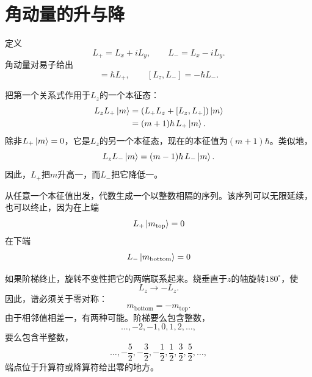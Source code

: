 \begin{classroomqa}
\end{classroomqa}

\section{角动量的升与降}

定义
\begin{equation}
L_+=L_x+iL_y,
\qquad
L_-=L_x-iL_y.
\end{equation}
角动量对易子给出
\begin{equation}
[L_z,L_+]=\hbar L_+,
\qquad
[L_z,L_-]=-\hbar L_-.
\end{equation}

把第一个关系式作用于\(L_z\)的一个本征态：
\begin{align}
L_zL_+\left\lvert m\right\rangle
&=\left(L_+L_z+[L_z,L_+]\right)\left\lvert m\right\rangle\\
&=(m+1)\hbar\,L_+\left\lvert m\right\rangle.
\end{align}
除非\(L_+\left\lvert m\right\rangle=0\)，它是\(L_z\)的另一个本征态，现在的本征值为\((m+1)\hbar\)。类似地，
\begin{equation}
L_zL_-\left\lvert m\right\rangle
=(m-1)\hbar\,L_-\left\lvert m\right\rangle.
\end{equation}
因此，\(L_+\)把\(m\)升高一，而\(L_-\)把它降低一。

从任意一个本征值出发，代数生成一个以整数相隔的序列。该序列可以无限延续，也可以终止，因为在上端
\begin{equation}
L_+\left\lvert m_{\mathrm{top}}\right\rangle=0
\end{equation}
在下端
\begin{equation}
L_-\left\lvert m_{\mathrm{bottom}}\right\rangle=0
\end{equation}

\begin{classroomqa}
\end{classroomqa}

如果阶梯终止，旋转不变性把它的两端联系起来。绕垂直于\(z\)的轴旋转\(180^\circ\)，使
\begin{equation}
L_z\longrightarrow-L_z.
\end{equation}
因此，谱必须关于零对称：
\begin{equation}
m_{\mathrm{bottom}}=-m_{\mathrm{top}}.
\end{equation}
由于相邻值相差一，有两种可能。阶梯要么包含整数，
\begin{equation}
\ldots,-2,-1,0,1,2,\ldots,
\end{equation}
要么包含半整数，
\begin{equation}
\ldots,-\frac{5}{2},-\frac{3}{2},-\frac{1}{2},
\frac{1}{2},\frac{3}{2},\frac{5}{2},\ldots,
\end{equation}
端点位于升算符或降算符给出零的地方。

